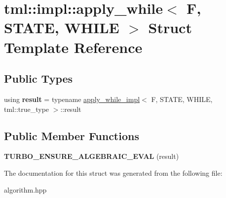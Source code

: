 \hypertarget{structtml_1_1impl_1_1apply__while}{\section{tml\+:\+:impl\+:\+:apply\+\_\+while$<$ F, S\+T\+A\+T\+E, W\+H\+I\+L\+E $>$ Struct Template Reference}
\label{structtml_1_1impl_1_1apply__while}
}
\subsection*{Public Types}
\begin{DoxyCompactItemize}
\item 
\hypertarget{structtml_1_1impl_1_1apply__while_af2f4fb600cf65d256a0a95cb42ae0c68}{using {\bfseries result} = typename \hyperlink{structtml_1_1impl_1_1apply__while__impl}{apply\+\_\+while\+\_\+impl}$<$ F, S\+T\+A\+T\+E, W\+H\+I\+L\+E, tml\+::true\+\_\+type $>$\+::result}\label{structtml_1_1impl_1_1apply__while_af2f4fb600cf65d256a0a95cb42ae0c68}

\end{DoxyCompactItemize}
\subsection*{Public Member Functions}
\begin{DoxyCompactItemize}
\item 
\hypertarget{structtml_1_1impl_1_1apply__while_a7a1a9ceb4e01fad5997bd6ae24d27553}{{\bfseries T\+U\+R\+B\+O\+\_\+\+E\+N\+S\+U\+R\+E\+\_\+\+A\+L\+G\+E\+B\+R\+A\+I\+C\+\_\+\+E\+V\+A\+L} (result)}\label{structtml_1_1impl_1_1apply__while_a7a1a9ceb4e01fad5997bd6ae24d27553}

\end{DoxyCompactItemize}


The documentation for this struct was generated from the following file\+:\begin{DoxyCompactItemize}
\item 
algorithm.\+hpp\end{DoxyCompactItemize}

